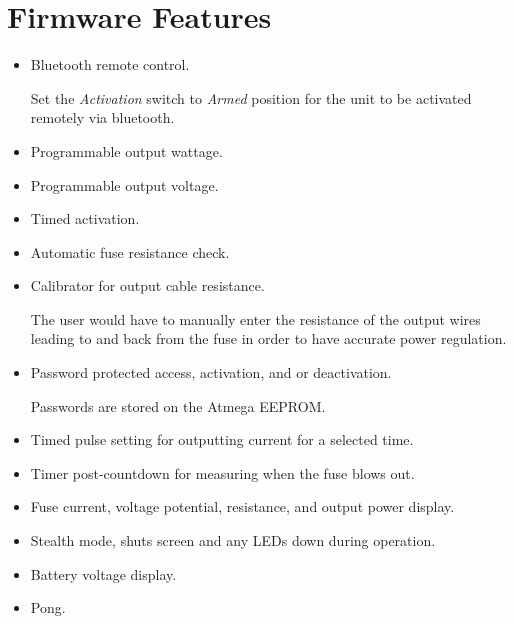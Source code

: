 \documentclass{article}
\begin{document}
\section{Firmware Features}
\begin{itemize}
	\item Bluetooth remote control.
	
	Set the \textit{Activation} switch to \textit{Armed} position for the unit to be activated remotely via bluetooth.
	\item Programmable output wattage.
	\item Programmable output voltage.
	\item Timed activation.
	\item Automatic fuse resistance check.
	\item Calibrator for output cable resistance.
	
	The user would have to manually enter the resistance of the output wires leading to and back from the fuse in order to have accurate power regulation.
	\item Password protected access, activation, and or deactivation.
	
	Passwords are stored on the Atmega EEPROM.
	\item Timed pulse setting for outputting current for a selected time.
	\item Timer post-countdown for measuring when the fuse blows out.
	\item Fuse current, voltage potential, resistance, and output power display.
	\item Stealth mode, shuts screen and any LEDs down during operation.
	\item Battery voltage display.
	\item Pong.



\end{itemize}
\end{document}
